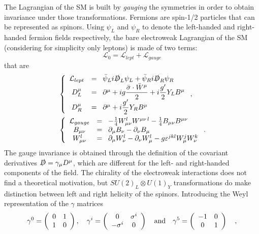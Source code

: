 The Lagrangian of the SM is built by {\it gauging} the symmetries in 
order to obtain invariance under those transformations.
Fermions are spin-1/2 particles that can be represented as spinors.
Using $\psi_{L}$ and 
$\psi_{R}$ to denote the left-handed and right-handed fermion fields 
respectively, 
the bare electroweak Lagrangian of the SM (considering 
for simplicity only leptons) is made of two terms:
\begin{equation}\label{eq:bareLagSM}
\mathcal{L}_{0} = \mathcal{L}_{lept}+ \mathcal{L}_{gauge}
\end{equation}
that are 
\begin{align}
&\left \{ \begin{array}{cl}
\mathcal{L}_{lept} &=\;\;  \bar\psi_{L}i\slashed{D}_{L}\psi_{L} + \bar\psi_{R}i\slashed{D}_{R}\psi_{R}\\
D_{L}^{\mu} &=\;\;  \partial^{\mu} + ig\dfrac{\bar{\sigma}\cdot\bar{W}^{\mu}}{2} + i\dfrac{g'}{2}Y_{L}B^{\mu}\\
D_{R}^{\mu} &=\;\;  \partial^{\mu} + i\dfrac{g'}{2}Y_{R}B^{\mu}
\end{array} \right. ,\label{eq:lagLep} \\
&\left \{ \begin{array}{cl}
\mathcal{L}_{gauge}  &=\;\;  -\frac{1}{4}W_{\mu\nu}^{l}W^{\mu\nu\, l}  -\frac{1}{4}B_{\mu\nu}B^{\mu\nu}\\
B_{\mu\nu} &=\;\;  \partial_{\mu}B_{\nu} - \partial_{\nu}B_{\mu}\\
W_{\mu\nu}^{l} &=\;\;  \partial_{\mu}W_{\nu}^{l} - \partial_{\nu}W_{\mu}^{l} - g\varepsilon^{jkl}W_{\mu}^{j}W_{\nu}^{k}
\end{array} \right. .\label{eq:lagGauge}
\end{align}
The gauge invariance is obtained through the definition of the
covariant derivatives $\slashed{D} = \gamma_{\mu}D^{\mu}$, 
which are different for the left- and
right-handed components of the field.
The chirality of the electroweak interactions does not find 
a theoretical motivation, but $SU(2)_{L} \otimes U(1)_{Y}$ transformations 
do make distinction between left and right helicity of the spinors.
Introducing the Weyl representation of the $\gamma$ matrices
\begin{equation}
\gamma^{0} = \left(\begin{array}{cc} 0 & 1 \\ 1 & 0 \\ \end{array}\right), \quad
\gamma^{i} = \left(\begin{array}{cc} 0 & \sigma^{i} \\ -\sigma^{i} & 0 \\ \end{array}\right) \quad \textnormal{and} \quad
\gamma^{5} = \left(\begin{array}{cc} -1 & 0 \\ 0 & 1 \\ \end{array}\right) \quad ,
\end{equation}
